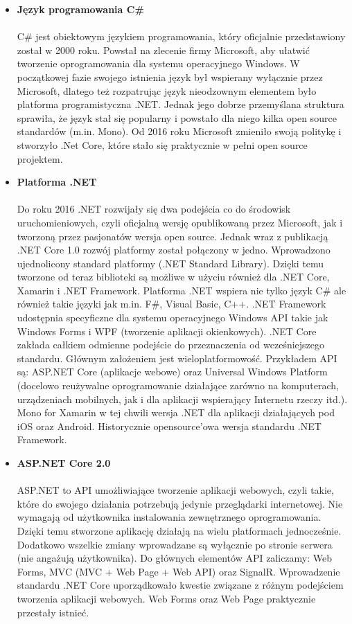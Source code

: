 \documentclass{article}
\begin{document}
\begin{itemize}
\item \textbf{Język programowania C\#} \\\\
C\# jest obiektowym językiem programowania, który oficjalnie przedstawiony został w 2000 roku. Powstał na zlecenie firmy Microsoft, aby ułatwić tworzenie oprogramowania dla systemu operacyjnego Windows. W początkowej fazie swojego istnienia język był wspierany wyłącznie przez Microsoft, dlatego też rozpatrując język nieodzownym elementem było platforma programistyczna .NET. Jednak jego dobrze przemyślana struktura sprawiła, że język stał się popularny i powstało dla niego kilka open source standardów (m.in. Mono). Od 2016 roku Microsoft zmieniło swoją politykę i stworzyło .Net Core, które stało się praktycznie w pełni open source projektem. 

\item \textbf{Platforma .NET} \\\\
Do roku 2016 .NET rozwijały się dwa podejścia co do środowisk uruchomieniowych, czyli oficjalną
wersję opublikowaną przez Microsoft, jak i tworzoną przez pasjonatów wersja open source. Jednak wraz z
publikacją .NET Core 1.0 rozwój platformy został połączony w jedno. Wprowadzono ujednolicony standard
platformy (.NET Standard Library). Dzięki temu tworzone od teraz biblioteki są możliwe w użyciu również dla .NET Core, Xamarin i .NET Framework. Platforma .NET wspiera nie tylko język C\# ale również takie języki jak m.in. F\#, Visual Basic, C++. .NET Framework udostępnia specyficzne dla systemu operacyjnego Windows API takie jak Windows Forms i WPF (tworzenie aplikacji okienkowych). .NET Core zakłada całkiem odmienne podejście do przeznaczenia od wcześniejszego standardu. Głównym
założeniem jest wieloplatformowość. Przykładem API są: ASP.NET Core (aplikacje webowe) oraz Universal Windows Platform (docelowo reużywalne oprogramowanie działające zarówno na komputerach, urządzeniach mobilnych, jak i dla aplikacji wspierający Internetu rzeczy itd.). Mono for Xamarin w tej chwili wersja .NET dla aplikacji działających pod iOS oraz Android. Historycznie opensource’owa wersja standardu .NET Framework.
\item \textbf{ASP.NET Core 2.0} \\\\
ASP.NET to API umożliwiające tworzenie aplikacji webowych\cite{asp}, czyli takie, które do swojego działania potrzebują jedynie przeglądarki internetowej. Nie wymagają od użytkownika instalowania zewnętrznego oprogramowania. Dzięki temu stworzone aplikację działają na wielu platformach jednocześnie. Dodatkowo wszelkie zmiany wprowadzane są wyłącznie po stronie serwera (nie angażują użytkownika). Do głównych elementów API zaliczamy: Web Forms, MVC (MVC + Web Page + Web API) oraz SignalR. Wprowadzenie standardu .NET Core uporządkowało kwestie związane z różnym podejściem tworzenia aplikacji webowych. Web Forms oraz Web Page praktycznie przestały istnieć.


\end{itemize}
\end{document}
